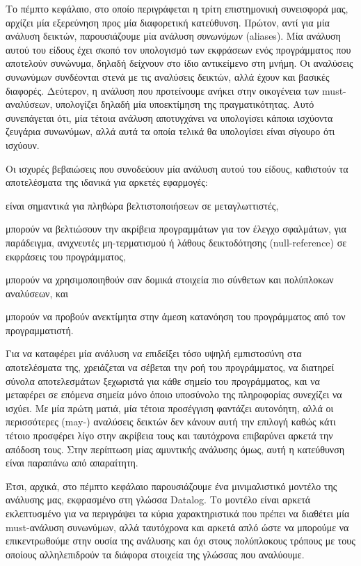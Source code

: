 Το πέμπτο κεφάλαιο, στο οποίο περιγράφεται η τρίτη επιστημονική συνεισφορά μας, αρχίζει μία εξερεύνηση προς μία διαφορετική κατεύθυνση. Πρώτον, αντί για μία ανάλυση δεικτών, παρουσιάζουμε μία ανάλυση \emph{συνωνύμων} ({\en aliases}). Μία ανάλυση αυτού του είδους έχει σκοπό τον υπολογισμό των εκφράσεων ενός προγράμματος που αποτελούν συνώνυμα, δηλαδή δείχνουν στο ίδιο αντικείμενο στη μνήμη. Οι αναλύσεις συνωνύμων συνδέονται στενά με τις αναλύσεις δεικτών, αλλά έχουν και βασικές διαφορές. Δεύτερον, η ανάλυση που προτείνουμε ανήκει στην οικογένεια των {\en must-}αναλύσεων, υπολογίζει δηλαδή μία υποεκτίμηση της πραγματικότητας. Αυτό συνεπάγεται ότι, μία τέτοια ανάλυση αποτυγχάνει να υπολογίσει κάποια ισχύοντα ζευγάρια συνωνύμων, αλλά αυτά τα οποία τελικά θα υπολογίσει είναι σίγουρο ότι ισχύουν.

Οι ισχυρές βεβαιώσεις που συνοδεύουν μία ανάλυση αυτού του είδους, καθιστούν τα αποτελέσματα της ιδανικά για αρκετές εφαρμογές:
\begin{inparaenum}[(1)]
\item είναι σημαντικά για πληθώρα βελτιστοποιήσεων σε μεταγλωττιστές,
\item μπορούν να βελτιώσουν την ακρίβεια προγραμμάτων για τον έλεγχο σφαλμάτων, για παράδειγμα, ανιχνευτές μη-τερματισμού ή λάθους δεικτοδότησης ({\en null-reference}) σε εκφράσεις του προγράμματος,
\item μπορούν να χρησιμοποιηθούν σαν δομικά στοιχεία πιο σύνθετων και πολύπλοκων αναλύσεων, και
\item μπορούν να προβούν ανεκτίμητα στην άμεση κατανόηση του προγράμματος από τον προγραμματιστή.
\end{inparaenum}

Για να καταφέρει μία ανάλυση να επιδείξει τόσο υψηλή εμπιστοσύνη στα αποτελέσματα της, χρειάζεται να σέβεται την ροή του προγράμματος, να διατηρεί σύνολα αποτελεσμάτων ξεχωριστά για κάθε σημείο του προγράμματος, και να μεταφέρει σε επόμενα σημεία μόνο όποιο υποσύνολο της πληροφορίας συνεχίζει να ισχύει. Με μία πρώτη ματιά, μία τέτοια προσέγγιση φαντάζει αυτονόητη, αλλά οι περισσότερες ({\en may}-) αναλύσεις δεικτών δεν κάνουν αυτή την επιλογή καθώς κάτι τέτοιο προσφέρει λίγο στην ακρίβεια τους και ταυτόχρονα επιβαρύνει αρκετά την απόδοση τους. Στην περίπτωση μίας αμυντικής ανάλυσης όμως, αυτή η κατεύθυνση είναι παραπάνω από απαραίτητη.

Έτσι, αρχικά, στο πέμπτο κεφάλαιο παρουσιάζουμε ένα μινιμαλιστικό μοντέλο της ανάλυσης μας, εκφρασμένο στη γλώσσα {\en Datalog}. Το μοντέλο είναι αρκετά εκλεπτυσμένο για να περιγράψει τα κύρια χαρακτηριστικά που πρέπει να διαθέτει μία {\en must-}ανάλυση συνωνύμων, αλλά ταυτόχρονα και αρκετά απλό ώστε να μπορούμε να επικεντρωθούμε στην ουσία της ανάλυσης και όχι στους πολύπλοκους τρόπους με τους οποίους αλληλεπιδρούν τα διάφορα στοιχεία της γλώσσας που αναλύουμε.

